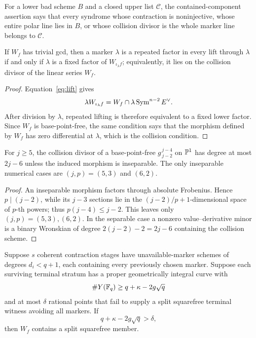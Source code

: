 \begin{definition}\label{def:contained}
For a lower bad scheme \(B\) and a closed upper list \(\mathcal C\), the
contained-component assertion says that every syndrome whose contraction is
noninjective, whose entire polar line lies in \(B\), or whose collision divisor
is the whole marker line belongs to \(\mathcal C\).
\end{definition}

\begin{lemma}
\label{lem:marker-collision}%
%
If \(W_f\) has trivial gcd, then a marker \(\lambda\) is a repeated factor in
every lift through \(\lambda\) if and only if \(\lambda\) is a fixed factor of
\(W_{\iota_\lambda f}\); equivalently, it lies on the collision divisor of
the linear series \(W_f\).
\end{lemma}

\begin{proof}
Equation~\eqref{eq:lift} gives
\[
 \lambda W_{\iota_\lambda f}
 =W_f\cap\lambda\operatorname{Sym}^{n-2}E^\vee.
\]
After division by \(\lambda\), repeated lifting is therefore equivalent to a
fixed lower factor.  Since \(W_f\) is base-point-free, the same condition says
that the morphism defined by \(W_f\) has zero differential at \(\lambda\),
which is the collision condition.
\end{proof}

\begin{lemma}
\label{lem:uniform-collision}%
%
For \(j\geq5\), the collision divisor of a base-point-free
\(g^{\,j-4}_{\,j-2}\) on \(\mathbb P^1\) has degree at most \(2j-6\) unless the
induced morphism is inseparable.  The only inseparable numerical cases are
\((j,p)=(5,3)\) and \((6,2)\).
\end{lemma}

\begin{proof}
An inseparable morphism factors through absolute Frobenius.  Hence
\(p\mid(j-2)\), while its \(j-3\) sections lie in the
\((j-2)/p+1\)-dimensional space of \(p\)-th powers; thus
\(p(j-4)\leq j-2\).  This leaves only \((j,p)=(5,3),(6,2)\).
In the separable case a nonzero value--derivative minor is a binary
Wronskian of degree \(2(j-2)-2=2j-6\) containing the collision scheme.
\end{proof}

\begin{theorem}
\label{thm:induction}%
%
%
Suppose \(s\) coherent contraction stages have unavailable-marker schemes of
degrees \(d_i<q+1\), each containing every previously chosen marker.  Suppose
each surviving terminal stratum has a proper
geometrically integral curve with
\[
 \#Y(\mathbb F_q)\geq q+\kappa-2g\sqrt q
\]
and at most \(\delta\) rational points that fail to supply a split squarefree
terminal witness avoiding all markers.  If
\[
 q+\kappa-2g\sqrt q>\delta,
\]
then \(W_f\) contains a split squarefree member.
\end{theorem}

